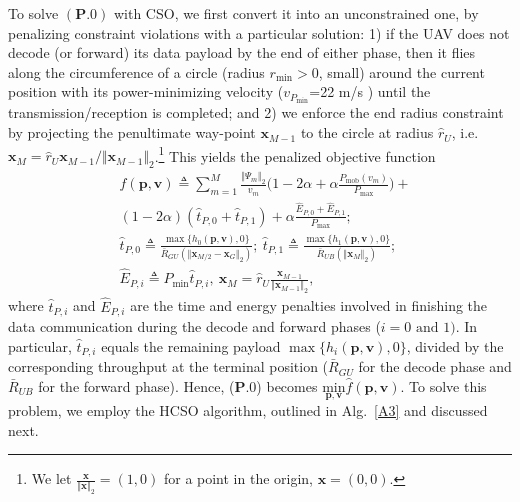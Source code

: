 \documentclass[10pt, twocolumn]{IEEEtran}
\theoremstyle{plain}
\theoremstyle{definition}
\theoremstyle{remark}
\begin{document}
To solve $(\mathbf{P.0})$ with CSO, we first convert it into an unconstrained one,  by penalizing constraint violations with a particular solution: 1) if the UAV does not decode (or forward) its data payload by the end of either phase, then it flies along the circumference of a circle (radius $r_{\mathrm{min}}{>}0$, small) around the current position with its power-minimizing velocity ($v_{P_{\mathrm{min}}}${=}22 m/s \cite{SCA}) until the transmission/reception is completed; and 2) we enforce the end radius constraint
by projecting the penultimate way-point $\mathbf{x}_{M{-}1}$ to the circle at radius $\hat{r}_{U}$, i.e.
$\mathbf x_M=\hat r_U\mathbf{x}_{M{-}1}/\Vert\mathbf{x}_{M{-}1}\Vert_2$.\footnote{We let $\frac{\mathbf{x}}{\Vert\mathbf{x}\Vert_{2}}{=}(1,0)$ for a point in the origin, $\mathbf{x}{=}(0,0)$.}
This yields the penalized objective function
\begin{align*}
    &\hat{f}(\mathbf{p},\mathbf{v}){\triangleq}\sum_{m{=}1}^{M}\frac{\Vert\Psi_{m}\Vert_{2}}{v_{m}}\Big(1-2\alpha+\alpha \frac{P_{\mathrm{mob}}(v_m)}{P_{\max}}\Big){+}\\&(1-2\alpha)(\hat{t}_{P,0}{+}\hat{t}_{P,1}){+}\alpha \frac{\hat{E}_{P,0}{+}\hat{E}_{P,1}}{P_{\max}};\nonumber\\
    &\hat{t}_{P,0}{\triangleq}\frac{\max\{h_{0}(\mathbf{p},\mathbf{v}),0\}}{\bar{R}_{GU}(\Vert\mathbf{x}_{M/2}-\mathbf{x}_{G}\Vert_{2})};\ 
    \hat{t}_{P,1}{\triangleq}\frac{\max\{h_{1}(\mathbf{p},\mathbf{v}),0\}}{\bar{R}_{UB}(\Vert\mathbf{x}_{M}\Vert_{2})};\\&\hat{E}_{P,i}{\triangleq}
    P_{\min}\hat{t}_{P,i},
    \ \mathbf x_M=\hat r_U\frac{\mathbf{x}_{M{-}1}}{\Vert\mathbf{x}_{M{-}1}\Vert_2},
\end{align*}
where $\hat{t}_{P,i}$ and $\hat{E}_{P,i}$ are the time and energy penalties involved in finishing the data communication during the decode and forward phases ($i{=}0\text{ and }1)$. 
In particular, $\hat{t}_{P,i}$ equals the remaining payload
$\max\{h_{i}(\mathbf{p},\mathbf{v}),0\}$, divided by the
corresponding throughput at the terminal position ($\bar R_{GU}$ for the decode phase and $\bar R_{UB}$ for the forward phase). Hence, ($\mathbf{P.0}$) becomes $\underset{\mathbf{p},\mathbf{v}}{\mathrm{min}}\hat{f}(\mathbf{p},\mathbf{v})$. To solve this problem, we employ the HCSO algorithm, outlined in Alg.~\ref{A3} and discussed next.
\end{document}
